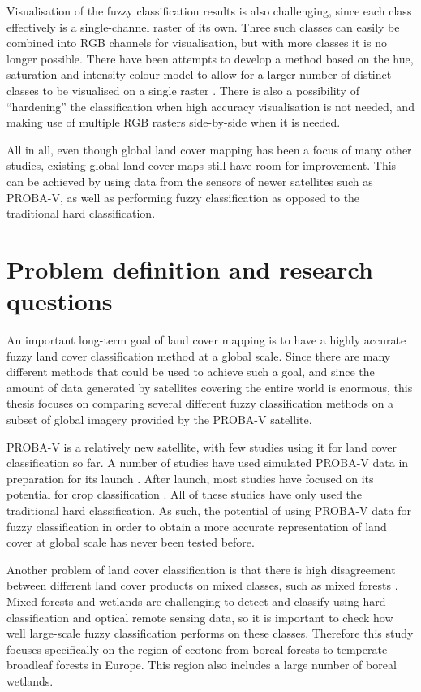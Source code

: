 \documentclass[a4paper,12pt]{scrbook}
\begin{document}
Visualisation of the fuzzy classification results is also challenging, since each class effectively is a single-channel raster of its own. Three such classes can easily be combined into RGB channels for visualisation, but with more classes it is no longer possible. There have been attempts to develop a method based on the hue, saturation and intensity colour model to allow for a larger number of distinct classes to be visualised on a single raster \citep{hengl2004fuzzycmeans}. There is also a possibility of ``hardening'' the classification when high accuracy visualisation is not needed, and making use of multiple RGB rasters side-by-side when it is needed.

All in all, even though global land cover mapping has been a focus of many other studies, existing global land cover maps still have room for improvement. This can be achieved by using data from the sensors of newer satellites such as PROBA-V, as well as performing fuzzy classification as opposed to the traditional hard classification.

\chapter{Problem definition and research questions}

An important long-term goal of land cover mapping is to have a highly accurate fuzzy land cover classification method at a global scale. Since there are many different methods that could be used to achieve such a goal, and since the amount of data generated by satellites covering the entire world is enormous, this thesis focuses on comparing several different fuzzy classification methods on a subset of global imagery provided by the PROBA-V satellite.

PROBA-V is a relatively new satellite, with few studies using it for land cover classification so far. A number of studies have used simulated PROBA-V data in preparation for its launch \citep{stathakis2014probavurban,roumenina2013probavcrops,bartalev2014probavboreal}. After launch, most studies have focused on its potential for crop classification \citep{roumenina2015probavcrops,durgun2016crop,lambert2016cropland}. All of these studies have only used the traditional hard classification. As such, the potential of using PROBA-V data for fuzzy classification in order to obtain a more accurate representation of land cover at global scale has never been tested before.

Another problem of land cover classification is that there is high disagreement between different land cover products on mixed classes, such as mixed forests \citep{Herold2008lccomparison}. Mixed forests and wetlands are challenging to detect and classify using hard classification and optical remote sensing data, so it is important to check how well large-scale fuzzy classification performs on these classes. Therefore this study focuses specifically on the region of ecotone from boreal forests to temperate broadleaf forests in Europe. This region also includes a large number of boreal wetlands. 
\end{document}
